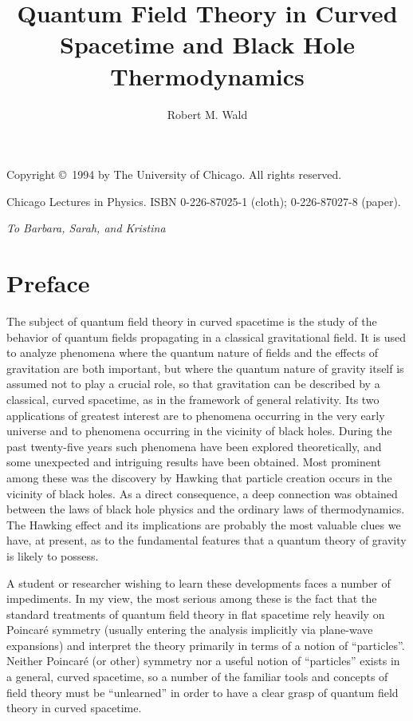 \documentclass[11pt,a4paper]{article}
\title{Quantum Field Theory in Curved Spacetime and Black Hole Thermodynamics}
\author{Robert M. Wald}
\affiliation{The University of Chicago Press, 1994}
\begin{document}
\maketitle
\begingroup\small
\noindent Copyright \copyright\ 1994 by The University of Chicago. All rights reserved.\par
\noindent Chicago Lectures in Physics. ISBN 0-226-87025-1 (cloth); 0-226-87027-8 (paper).\par
\endgroup
\vspace{1cm}
\begin{center}\emph{To Barbara, Sarah, and Kristina}\end{center}
\clearpage
\tableofcontents
\clearpage
\clearpage
\hypertarget{source-8}{}
\section*{Preface}

The subject of quantum field theory in curved spacetime is the study of the behavior of quantum fields propagating in a classical gravitational field. It is used to analyze phenomena where the quantum nature of fields and the effects of gravitation are both important, but where the quantum nature of gravity itself is assumed not to play a crucial role, so that gravitation can be described by a classical, curved spacetime, as in the framework of general relativity. Its two applications of greatest interest are to phenomena occurring in the very early universe and to phenomena occurring in the vicinity of black holes. During the past twenty-five years such phenomena have been explored theoretically, and some unexpected and intriguing results have been obtained. Most prominent among these was the discovery by Hawking that particle creation occurs in the vicinity of black holes. As a direct consequence, a deep connection was obtained between the laws of black hole physics and the ordinary laws of thermodynamics. The Hawking effect and its implications are probably the most valuable clues we have, at present, as to the fundamental features that a quantum theory of gravity is likely to possess.

A student or researcher wishing to learn these developments faces a number of impediments. In my view, the most serious among these is the fact that the standard treatments of quantum field theory in flat spacetime rely heavily on Poincaré symmetry (usually entering the analysis implicitly via plane-wave expansions) and interpret the theory primarily in terms of a notion of ``particles''. Neither Poincaré (or other) symmetry nor a useful notion of ``particles'' exists in a general, curved spacetime, so a number of the familiar tools and concepts of field theory must be ``unlearned'' in order to have a clear grasp of quantum field theory in curved spacetime.
\end{document}
